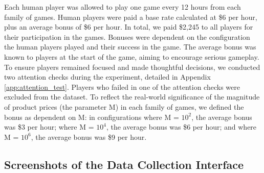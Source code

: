 Each human player was allowed to play one game every 12 hours from each family of games. Human players were paid a base rate calculated at \$6 per hour, plus an average bonus of \$6 per hour. In total, we paid \$2,245 to all players for their participation in the games.
Bonuses were dependent on the configuration the human players played and their success in the game. The average bonus was known to players at the start of the game, aiming to encourage serious gameplay. To ensure players remained focused and made thoughtful decisions, we conducted two attention checks during the experiment, detailed in Appendix \ref{app:attention_test}. Players who failed in one of the attention checks were excluded from the dataset.
To reflect the real-world significance of the magnitude of product prices (the parameter M) in each family of games, we defined the bonus as dependent on M: in configurations where M = $10^2$, the average bonus was \$3 per hour; where M = $10^4$, the average bonus was \$6 per hour; and where M = $10^6$, the average bonus was \$9 per hour.



\subsection{Screenshots of the Data Collection Interface}
\label{app:interface}

